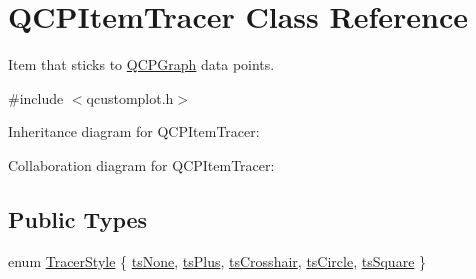 \hypertarget{class_q_c_p_item_tracer}{}\section{Q\+C\+P\+Item\+Tracer Class Reference}
\label{class_q_c_p_item_tracer}


Item that sticks to \hyperlink{class_q_c_p_graph}{Q\+C\+P\+Graph} data points.  




{\ttfamily \#include $<$qcustomplot.\+h$>$}



Inheritance diagram for Q\+C\+P\+Item\+Tracer\+:


Collaboration diagram for Q\+C\+P\+Item\+Tracer\+:
\subsection*{Public Types}
\begin{DoxyCompactItemize}
\item 
enum \hyperlink{class_q_c_p_item_tracer_a2f05ddb13978036f902ca3ab47076500}{Tracer\+Style} \{ \newline
\hyperlink{class_q_c_p_item_tracer_a2f05ddb13978036f902ca3ab47076500aac27462c79146225bfa8fba24d2ee8a4}{ts\+None}, 
\hyperlink{class_q_c_p_item_tracer_a2f05ddb13978036f902ca3ab47076500a3323fb04017146e4885e080a459472fa}{ts\+Plus}, 
\hyperlink{class_q_c_p_item_tracer_a2f05ddb13978036f902ca3ab47076500af562ec81ac3ba99e26ef8540cf1ec16f}{ts\+Crosshair}, 
\hyperlink{class_q_c_p_item_tracer_a2f05ddb13978036f902ca3ab47076500ae2252c28f4842880d71e9f94e69de94e}{ts\+Circle}, 
\newline
\hyperlink{class_q_c_p_item_tracer_a2f05ddb13978036f902ca3ab47076500a4ed5f01f2c5fd86d980366d79f481b9b}{ts\+Square}
 \}
\end{DoxyCompactItemize}
